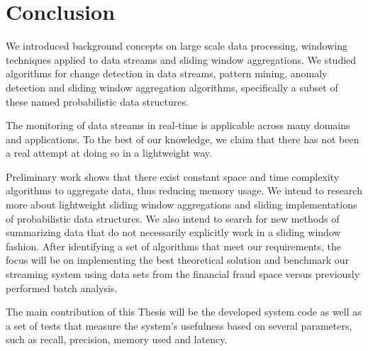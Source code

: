 \chapter{Conclusion} \label{chap:conclusion} \minitoc

We introduced background concepts on large scale data processing, windowing techniques applied to data streams and sliding window aggregations. We studied algorithms for change detection in data streams, pattern mining, anomaly detection and sliding window aggregation algorithms, specifically a subset of these named probabilistic data structures. 

The monitoring of data streams in real-time is applicable across many domains and applications. To the best of our knowledge, we claim that there has not been a real attempt at doing so in a lightweight way.

Preliminary work shows that there exist constant space and time complexity algorithms to aggregate data, thus reducing memory usage. We intend to research more about lightweight sliding window aggregations and sliding implementations of probabilistic data structures. We also intend to search for new methods of summarizing data that do not necessarily explicitly work in a sliding window fashion. After identifying a set of algorithms that meet our requirements, the focus will be on implementing the best theoretical solution and benchmark our streaming system using data sets from the financial fraud space versus previously performed batch analysis.

The main contribution of this Thesis will be the developed system code as well as a set of tests that measure the system's usefulness based on several parameters, such as recall, precision, memory used and latency.